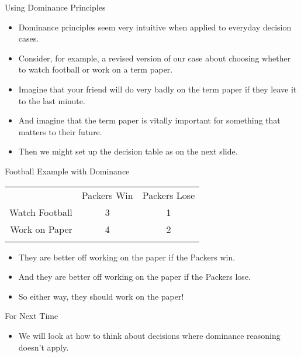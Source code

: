 \documentclass[
  ignorenonframetext,
]{beamer}
\providecommand{\tightlist}{%
  \setlength{\itemsep}{0pt}\setlength{\parskip}{0pt}}
\renewcommand{\,}{\text{, }}
\begin{document}
\begin{frame}{Using Dominance Principles}
\protect\hypertarget{using-dominance-principles}{}
\begin{itemize}
\tightlist
\item
  Dominance principles seem very intuitive when applied to everyday
  decision cases.
\item
  Consider, for example, a revised version of our case about choosing
  whether to watch football or work on a term paper.
\item
  Imagine that your friend will do very badly on the term paper if they
  leave it to the last minute.
\item
  And imagine that the term paper is vitally important for something
  that matters to their future.
\item
  Then we might set up the decision table as on the next slide.
\end{itemize}
\end{frame}

\begin{frame}{Football Example with Dominance}
\protect\hypertarget{football-example-with-dominance}{}
\begin{longtable}[]{@{}rcc@{}}
\toprule
& Packers Win & Packers Lose \\ \addlinespace
\midrule
\endhead
Watch Football & 3 & 1 \\ \addlinespace
Work on Paper & 4 & 2 \\ \addlinespace
\bottomrule
\end{longtable}

\begin{itemize}
\tightlist
\item
  They are better off working on the paper if the Packers win.
\item
  And they are better off working on the paper if the Packers lose.
\item
  So either way, they should work on the paper!
\end{itemize}
\end{frame}

\begin{frame}{For Next Time}
\protect\hypertarget{for-next-time}{}
\begin{itemize}
\tightlist
\item
  We will look at how to think about decisions where dominance reasoning
  doesn't apply.
\end{itemize}
\end{frame}
\end{document}

